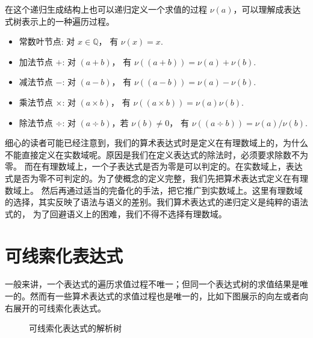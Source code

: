 \documentclass[a4paper,12pt]{book}
\numberwithin{problem}{section}
\numberwithin{definition}{section}
\numberwithin{lemma}{section}
\numberwithin{proposition}{section}
\numberwithin{theorem}{section}
\numberwithin{grammar}{section}
\numberwithin{program}{section}
\numberwithin{convention}{section}
\numberwithin{corollary}{section}
\begin{document}
在这个递归生成结构上也可以递归定义一个求值的过程 $\nu(a)$，可以理解成表达式树表示上的一种遍历过程。

\begin{itemize}
\item 常数叶节点: 对 $x \in \mathbb{Q}$， 有 $\nu(x) = x$.
\item 加法节点 $+$: 对 $(a + b)$， 有 $\nu((a + b)) = \nu(a) + \nu(b)$.
\item 减法节点 $-$: 对 $(a - b)$， 有 $\nu((a - b)) = \nu(a) - \nu(b)$.
\item 乘法节点 $\times$: 对 $(a \times b)$， 有 $\nu((a \times b)) = \nu(a) \nu(b)$.
\item 除法节点 $\div$: 对 $(a \div b)$，若 $\nu(b) \neq 0$， 有 $\nu((a \div b)) = \nu(a) / \nu(b)$.
\end{itemize}

细心的读者可能已经注意到，我们的算术表达式时是定义在有理数域上的，为什么不能直接定义在实数域呢。原因是我们在定义表达式的除法时，必须要求除数不为零。
而在有理数域上，一个子表达式是否为零是可以判定的。在实数域上，表达式是否为零不可判定的。为了使概念的定义完整，我们先把算术表达式定义在有理数域上。
然后再通过适当的完备化的手法，把它推广到实数域上。这里有理数域的选择，其实反映了语法与语义的差别。我们算术表达式的递归定义是纯粹的语法式的，
为了回避语义上的困难，我们不得不选择有理数域。

\section{可线索化表达式}

一般来讲，一个表达式的遍历求值过程不唯一；但同一个表达式树的求值结果是唯一的。然而有一些算术表达式的求值过程也是唯一的，比如下图展示的向左或者向右展开的可线索化表达式。

\begin{figure}[ht]
\centering
{}
\caption{可线索化表达式的解析树}\label{fig:syntaxtree-left-right}
\end{figure}
\end{document}
